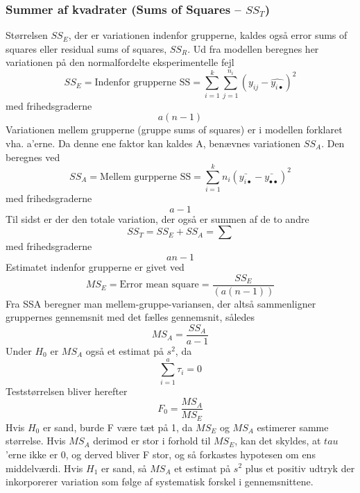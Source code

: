\documentclass[11pt]{article}
\begin{document}
\subsubsection{Summer af kvadrater (Sums of Squares -- $SS_T$)}
Størrelsen $SS_E$, der er variationen indenfor grupperne, kaldes også error sums of squares eller residual sums of squares, $SS_R$. Ud fra modellen beregnes her variationen på den normalfordelte eksperimentelle fejl
$$SS_E=\text{Indenfor grupperne SS}=\sum^k_{i=1}\sum^{n_i}_{j=1} (y_{ij}-\hat{y_{i\bullet}})^2 $$
med frihedsgraderne 
$$a(n-1)$$
Variationen mellem grupperne (gruppe sums of squares) er i modellen forklaret vha. a'erne. Da denne ene faktor kan kaldes A, benævnes variationen $SS_A$. Den beregnes ved
$$SS_A=\text{Mellem gurpperne SS}=\sum^k_{i=1}n_i(\bar{y_{i\bullet}}-\bar{y_{\bullet\bullet}})^2$$
med frihedsgraderne
$$a-1$$
Til sidst er der den totale variation, der også er summen af de to andre
$$SS_T=SS_E+SS_A=\sum$$
med frihedsgraderne
$$an-1$$
Estimatet indenfor grupperne er givet ved
$$MS_E=\text{Error mean square}=\frac{SS_E}{(a(n-1))}$$
Fra SSA beregner man mellem-gruppe-variansen, der altså sammenligner gruppernes gennemsnit med det fælles gennemsnit, således
$$MS_A=\frac{SS_A}{a-1}$$
Under $H_0$ er $MS_A$ også et estimat på $s^2$, da
$$\sum^a_{i=1}\tau_i=0$$
Teststørrelsen bliver herefter
$$F_0=\frac{MS_A}{MS_E}$$
Hvis $H_0$ er sand, burde F være tæt på 1, da $MS_E$ og $MS_A$ estimerer samme størrelse. Hvis $MS_A$ derimod er stor i forhold til $MS_E$, kan det skyldes, at $tau$'erne ikke er 0, og derved bliver F stor, og så forkastes hypotesen om ens middelværdi. Hvis $H_1$ er sand, så $MS_A$ et estimat på $s^2$ plus et positiv udtryk der inkorporerer variation som følge af systematisk forskel i gennemsnittene.
\end{document}
